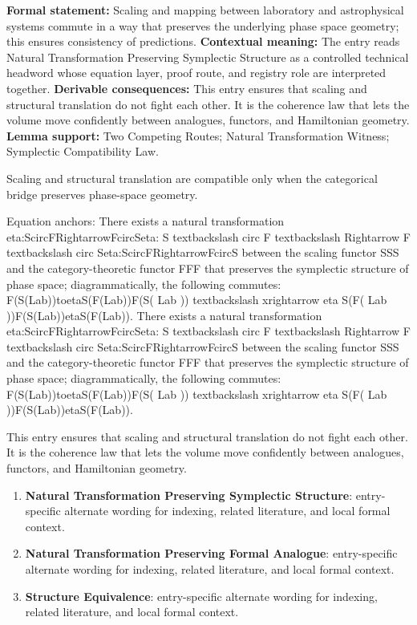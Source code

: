 \begingroup\footnotesize\setlength{\emergencystretch}{3em}\sloppy
\textbf{Formal statement:} Scaling and mapping between laboratory and astrophysical systems commute in a way that preserves the underlying phase space geometry; this ensures consistency of predictions. \textbf{Contextual meaning:} The entry reads Natural Transformation Preserving Symplectic Structure as a controlled technical headword whose equation layer, proof route, and registry role are interpreted together. \textbf{Derivable consequences:} This entry ensures that scaling and structural translation do not fight each other. It is the coherence law that lets the volume move confidently between analogues, functors, and Hamiltonian geometry. \textbf{Lemma support:} Two Competing Routes; Natural Transformation Witness; Symplectic Compatibility Law.\par
\endgroup

Scaling and structural translation are compatible only when the categorical bridge preserves phase-space geometry.

Equation anchors: There exists a natural transformation eta:ScircFRightarrowFcircSeta: S textbackslash circ F textbackslash Rightarrow F textbackslash circ Seta:ScircFRightarrowFcircS between the scaling functor SSS and the category-theoretic functor FFF that preserves the symplectic structure of phase space; diagrammatically, the following commutes: F(S(Lab))toetaS(F(Lab))F(S( Lab )) textbackslash xrightarrow eta S(F( Lab ))F(S(Lab))etaS(F(Lab)). There exists a natural transformation eta:ScircFRightarrowFcircSeta: S textbackslash circ F textbackslash Rightarrow F textbackslash circ Seta:ScircFRightarrowFcircS between the scaling functor SSS and the category-theoretic functor FFF that preserves the symplectic structure of phase space; diagrammatically, the following commutes: F(S(Lab))toetaS(F(Lab))F(S( Lab )) textbackslash xrightarrow eta S(F( Lab ))F(S(Lab))etaS(F(Lab)).

This entry ensures that scaling and structural translation do not fight each other. It is the coherence law that lets the volume move confidently between analogues, functors, and Hamiltonian geometry.
\endgroup

\begingroup\footnotesize\sloppy
\begin{enumerate}[leftmargin=1.35em,itemsep=1pt,topsep=1pt,parsep=0pt]
\item \textbf{Natural Transformation Preserving Symplectic Structure}: entry-specific alternate wording for indexing, related literature, and local formal context.
\item \textbf{Natural Transformation Preserving Formal Analogue}: entry-specific alternate wording for indexing, related literature, and local formal context.
\item \textbf{Structure Equivalence}: entry-specific alternate wording for indexing, related literature, and local formal context.
\end{enumerate}
\endgroup

